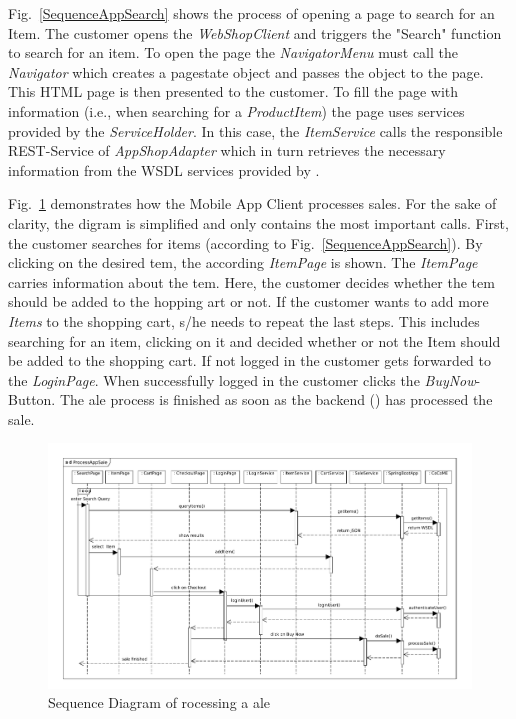 Fig.~\ref{SequenceAppSearch} shows the process of opening a page to search for an Item. 
The customer opens the \textit{WebShopClient} and triggers the "Search" function to search for an item. 
To open the page the \textit{NavigatorMenu} must call the \textit{Navigator} which creates a pagestate object and passes the object to the page. 
This HTML page is then presented to the customer. 
To fill the page with information (i.e., when searching for a \textit{ProductItem}) the page uses services provided by the \textit{ServiceHolder}. 
In this case, the \textit{ItemService} calls the responsible REST-Service of \textit{AppShopAdapter} which in turn retrieves the necessary information from the WSDL services provided by \CoCoME.

Fig.~\ref{SequenceAppSale} demonstrates how the Mobile App Client processes sales. 
For the sake of clarity, the digram is simplified and only contains the most important calls. 
First, the customer searches for items (according to Fig.~\ref{SequenceAppSearch}). 
By clicking on the desired tem, the according \textit{ItemPage} is shown. 
The \textit{ItemPage} carries information about the tem. 
Here, the customer decides whether the tem should be added to the hopping art or not. 
If the customer wants to add more \textit{Items} to the shopping cart, s/he needs to repeat the last steps. This includes searching for an item, clicking on it and decided whether or not the Item should be added to the shopping cart.
If not logged in the customer gets forwarded to the \textit{LoginPage}. 
When successfully logged in the customer clicks the \textit{BuyNow}-Button. 
The ale process is finished as soon as the backend (\CoCoME) has processed the sale.


\begin{figure}[!h]
	\includegraphics[width=\textwidth]{img/appProcessSale.pdf}
	\caption{Sequence Diagram of rocessing a ale}
	\label{SequenceAppSale}
\end{figure}

